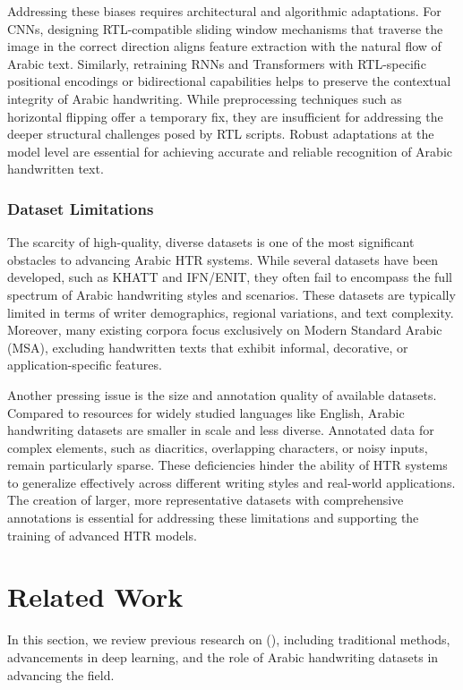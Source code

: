 \documentclass[conference]{IEEEtran}
\begin{document}
Addressing these biases requires architectural and algorithmic adaptations. For CNNs, designing RTL-compatible sliding window mechanisms that traverse the image in the correct direction aligns feature extraction with the natural flow of Arabic text. Similarly, retraining RNNs and Transformers with RTL-specific positional encodings or bidirectional capabilities helps to preserve the contextual integrity of Arabic handwriting. While preprocessing techniques such as horizontal flipping offer a temporary fix, they are insufficient for addressing the deeper structural challenges posed by RTL scripts. Robust adaptations at the model level are essential for achieving accurate and reliable recognition of Arabic handwritten text.


\subsubsection{Dataset Limitations}

The scarcity of high-quality, diverse datasets is one of the most significant obstacles to advancing Arabic HTR systems. While several datasets have been developed, such as KHATT and IFN/ENIT, they often fail to encompass the full spectrum of Arabic handwriting styles and scenarios. These datasets are typically limited in terms of writer demographics, regional variations, and text complexity. Moreover, many existing corpora focus exclusively on Modern Standard Arabic (MSA), excluding handwritten texts that exhibit informal, decorative, or application-specific features.

Another pressing issue is the size and annotation quality of available datasets. Compared to resources for widely studied languages like English, Arabic handwriting datasets are smaller in scale and less diverse. Annotated data for complex elements, such as diacritics, overlapping characters, or noisy inputs, remain particularly sparse. These deficiencies hinder the ability of HTR systems to generalize effectively across different writing styles and real-world applications. The creation of larger, more representative datasets with comprehensive annotations is essential for addressing these limitations and supporting the training of advanced HTR models.










\section{Related Work}
In this section, we review previous research on (), including traditional methods, advancements in deep learning, and the role of Arabic handwriting datasets in advancing the field.
\end{document}
